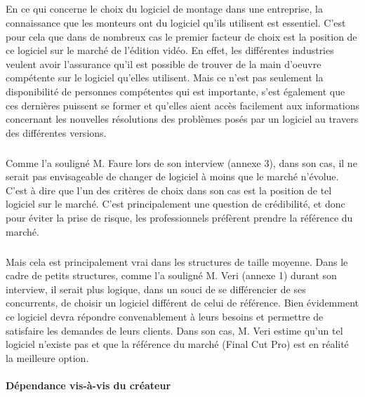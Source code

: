 \subparagraph{}

En ce qui concerne le choix du logiciel de montage dans une entreprise,
la connaissance que les monteurs ont du logiciel qu'ils utilisent est
essentiel.  C'est pour cela que dans de nombreux cas le premier facteur
de choix est la position de ce logiciel sur le marché de l'édition
vidéo. En effet, les différentes industries veulent avoir l'assurance qu'il
est possible de trouver de la main d'oeuvre compétente sur le logiciel
qu'elles utilisent. Mais ce n'est pas seulement la disponibilité de
personnes compétentes qui est importante, s'est également
que ces dernières puissent se former et qu'elles aient accès facilement
aux informations concernant les nouvelles résolutions des problèmes
posés par un logiciel au travers des différentes versions.

\subparagraph{}

Comme l'a souligné M. Faure lors de son interview (annexe 3), dans
son cas, il ne serait pas envisageable de changer de logiciel à moins
que le marché n'évolue. C'est à dire que l'un des critères de choix
dans son cas est la position de tel logiciel sur le marché. C'est
principalement une question de crédibilité, et donc pour éviter la
prise de risque, les professionnels préfèrent prendre la référence
du marché.

\subparagraph{}

Mais cela est principalement vrai dans les structures de taille moyenne.
Dans le cadre de petits structures, comme l'a souligné M. Veri (annexe
1) durant son interview, il serait plus logique, dans un souci de se
différencier de ses concurrents, de choisir un logiciel différent
de celui de référence. Bien évidemment ce logiciel devra répondre
convenablement à leurs besoins et permettre de satisfaire les demandes de
leurs clients. Dans son cas, M. Veri estime qu'un tel logiciel n'existe
pas et que la référence du marché (Final Cut Pro) est en réalité
la meilleure option.

\paragraph{Dépendance vis-à-vis du créateur}

\subparagraph{}

